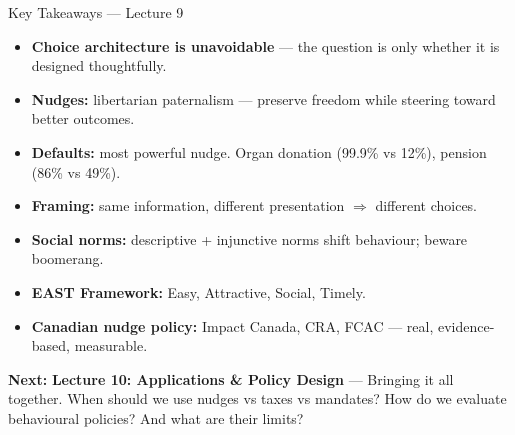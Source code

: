 \documentclass[aspectratio=169]{beamer}
\begin{document}
\begin{frame}{Key Takeaways --- Lecture 9}
\begin{itemize}
  \item[\textcolor{beteal}{\checkmark}] \textbf{Choice architecture is unavoidable} --- the question is only whether it is designed thoughtfully.
  \item[\textcolor{beteal}{\checkmark}] \textbf{Nudges:} libertarian paternalism --- preserve freedom while steering toward better outcomes.
  \item[\textcolor{beteal}{\checkmark}] \textbf{Defaults:} most powerful nudge. Organ donation (99.9\% vs 12\%), pension (86\% vs 49\%).
  \item[\textcolor{beteal}{\checkmark}] \textbf{Framing:} same information, different presentation $\Rightarrow$ different choices.
  \item[\textcolor{beteal}{\checkmark}] \textbf{Social norms:} descriptive + injunctive norms shift behaviour; beware boomerang.
  \item[\textcolor{beteal}{\checkmark}] \textbf{EAST Framework:} Easy, Attractive, Social, Timely.
  \item[\textcolor{beteal}{\checkmark}] \textbf{Canadian nudge policy:} Impact Canada, CRA, FCAC --- real, evidence-based, measurable.
\end{itemize}
\medskip\textcolor{beblue}{\textbf{Next:}} \textbf{Lecture 10: Applications \& Policy Design} --- Bringing it all together. When should we use nudges vs taxes vs mandates? How do we evaluate behavioural policies? And what are their limits?
\end{frame}
\end{document}
